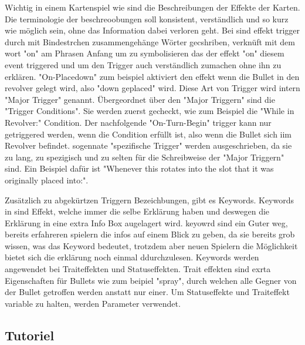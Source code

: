Wichtig in einem Kartenspiel wie \FF sind die Beschreibungen der Effekte der Karten. Die terminologie der beschreoobungen
soll konsistent, verständlich und so kurz wie möglich sein, ohne das Information dabei verloren geht. Bei \FF sind
effekt trigger durch mit Bindestrchen zusammengehänge Wörter gecshriben, verknüft mit dem wort "on" am Phrasen Anfang um zu symbolisieren
das der effekt "on" diesem event triggered und um den Trigger auch verständlich zumachen ohne ihn zu erklären.
"On-Placedown" zum beispiel aktiviert den effekt wenn die Bullet in den revolver gelegt wird, also "down geplaced" wird.
Diese Art von Trigger wird intern "Major Trigger" genannt.
Übergeordnet über den "Major Triggern" sind die "Trigger Conditions". Sie werden zuerst gecheckt, wie zum Beispiel die "While in Revolver:" Condition.
Der nachfolgende "On-Turn-Begin" trigger kann nur getriggered werden, wenn die Condition erfüllt ist, also wenn die Bullet sich iim Revolver befindet. %
sogennate "spezifische Trigger" werden ausgeschrieben, da sie zu lang, zu spezigisch und zu selten für die Schreibweise der "Major Triggern" sind. Ein Beispiel dafür ist
"Whenever this rotates into the slot that it was originally placed into:".


Zusätzlich zu abgekürtzen Triggern Bezeichbungen, gibt es Keywords. Keywords in \FF sind Effekt, welche immer die selbe
Erklärung haben und deswegen die Erklärung in eine extra Info Box augelagert wird. %
keyowrd sind ein Guter weg, bereits erfahreren spielern die infos auf einem Blick zu geben, da sie bereits grob wissen,
was das Keyword bedeutet, trotzdem aber neuen Spielern die Möglichkeit bietet sich die erklärung noch einmal ddurchzulesen.
Keywords werden angewendet bei Traiteffekten und Statuseffekten. Trait effekten sind exrta Eigenschaften für Bullets wie
zum beipiel "spray", durch welchen alle Gegner von der Bullet getroffen werden anstatt nur einer.
Um Statuseffekte und Traiteffekt variable zu halten, werden Parameter verwendet. %





\subsection{Tutoriel}\label{subsec:placementMatters}


